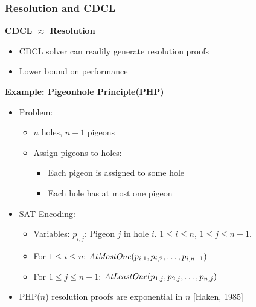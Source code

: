 \documentclass[t,pdf]{beamer}
\begin{document}
\begin{frame}
  \frametitle{Resolution and CDCL}
  
{\bf CDCL $\approx$ Resolution}
\begin{itemize}
\item {}CDCL solver can readily generate resolution  proofs 
\item {}Lower bound on performance
\end{itemize}
{\bf Example: Pigeonhole Principle(PHP)}
\begin{itemize}
\item Problem:
  \begin{itemize}
    \item $n$ holes, $n+1$ pigeons
    \item Assign pigeons to holes:
      \begin{itemize}
      \item Each pigeon is assigned to some hole
      \item Each hole has at most one pigeon
      \end{itemize}
  \end{itemize}
\item SAT Encoding:
  \begin{itemize}
    \item Variables: $p_{i,j}$: Pigeon $j$ in hole $i$.  $1 \leq i \leq n$, $1 \leq j \leq n+1$. 
    \item For $1 \leq i \leq n$: ${\it AtMostOne}(p_{i,1}, p_{i,2}, \ldots, p_{i,n+1})$
    \item For $1 \leq j \leq n+1$: ${\it AtLeastOne}(p_{1,j}, p_{2,j}, \ldots, p_{n,j})$
  \end{itemize}
\item PHP($n$) resolution proofs are exponential in $n$ [Haken, 1985]
\end{itemize}

\end{frame}
\end{document}
